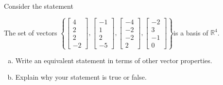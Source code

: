 
\begin{exerciseStatement}


Consider the statement 
\begin{center}\begin{minipage}{0.8\textwidth}
 The set of vectors \( \left\{ \left[\begin{array}{c}
4 \\
2 \\
2 \\
-2
\end{array}\right] , \left[\begin{array}{c}
-1 \\
1 \\
2 \\
-5
\end{array}\right] , \left[\begin{array}{c}
-4 \\
-2 \\
-2 \\
2
\end{array}\right] , \left[\begin{array}{c}
-2 \\
3 \\
-1 \\
0
\end{array}\right] \right\} \)is a basis of \(\mathbb{R}^4\). 
\end{minipage}\end{center}
    


\begin{enumerate}[(a)]
\item  Write an equivalent statement in terms of other vector properties.
\item  Explain why your statement is true or false.
\end{enumerate}
    
\end{exerciseStatement}
    

